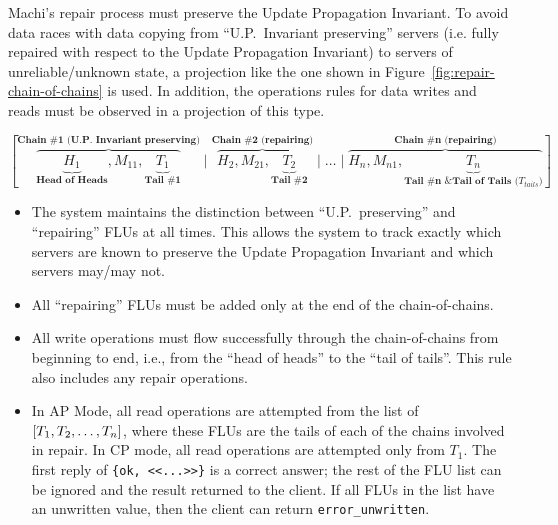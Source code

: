 \documentclass[preprint,10pt]{sigplanconf}
\begin{document}
Machi's repair process must preserve the Update Propagation
Invariant.  To avoid data races with data copying from
``U.P.~Invariant preserving'' servers (i.e. fully repaired with
respect to the Update Propagation Invariant)
to servers of unreliable/unknown state, a
projection like the one shown in
Figure~\ref{fig:repair-chain-of-chains} is used.  In addition, the
operations rules for data writes and reads must be observed in a
projection of this type.

\begin{figure*}
\centering
$
[\overbrace{\underbrace{H_1}_\textbf{Head of Heads}, M_{11},
      \underbrace{T_1}_\textbf{Tail \#1}}^\textbf{Chain \#1 (U.P.~Invariant preserving)}
\mid
\overbrace{H_2, M_{21},
      \underbrace{T_2}_\textbf{Tail \#2}}^\textbf{Chain \#2 (repairing)}
\mid \ldots \mid
\overbrace{H_n, M_{n1},
      \underbrace{T_n}_\textbf{Tail \#n \& Tail of Tails ($T_{tails}$)}}^\textbf{Chain \#n (repairing)}
]
$
\caption{Representation of a ``chain of chains'': a chain prefix of
  Update Propagation Invariant preserving FLUs (``Chain \#1'')
  with FLUs from $n-1$ other chains under repair.}
\label{fig:repair-chain-of-chains}
\end{figure*}

\begin{itemize}

\item The system maintains the distinction between ``U.P.~preserving''
  and ``repairing'' FLUs at all times.  This allows the system to
  track exactly which servers are known to preserve the Update
  Propagation Invariant and which servers may/may not.

\item All ``repairing'' FLUs must be added only at the end of the
  chain-of-chains.

\item All write operations must flow successfully through the
  chain-of-chains from beginning to end, i.e., from the ``head of
  heads'' to the ``tail of tails''.  This rule also includes any
  repair operations.

\item In AP Mode, all read operations are attempted from the list of
$[T_1,\-T_2,\-\ldots,\-T_n]$, where these FLUs are the tails of each of the
chains involved in repair.
In CP mode, all read operations are attempted only from $T_1$.
The first reply of {\tt \{ok, <<...>>\}} is a correct answer;
the rest of the FLU list can be ignored and the result returned to the
client.  If all FLUs in the list have an unwritten value, then the
client can return {\tt error\_unwritten}.

\end{itemize}
\end{document}
